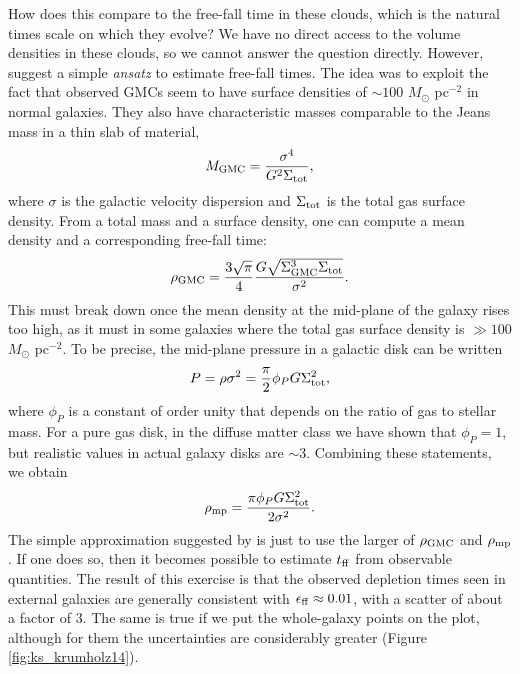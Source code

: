 How does this compare to the free-fall time in these clouds, which is the natural times scale on which they evolve? We have no direct access to the volume densities in these clouds, so we cannot answer the question directly. However, \citet{krumholz12a} suggest a simple \textit{ansatz} to estimate free-fall times. The idea was to exploit the fact that observed GMCs seem to have surface densities of $\sim 100$ $M_\odot$ pc$^{-2}$ in normal galaxies. They also have characteristic masses comparable to the Jeans mass in a thin slab of material,
\begin{equation}
M_{\rm GMC} = \frac{\sigma^4}{G^2 \Sigma_{\rm tot}},
\end{equation}
where $\sigma$ is the galactic velocity dispersion and $\Sigma_{\rm tot}$ is the total gas surface density. From a total mass and a surface density, one can compute a mean density and a corresponding free-fall time:
\begin{equation}
\rho_{\rm GMC} = \frac{3\sqrt{\pi}}{4} \frac{G \sqrt{\Sigma_{\rm GMC}^3 \Sigma_{\rm tot}}}{\sigma^2}.
\end{equation}
This must break down once the mean density at the mid-plane of the galaxy rises too high, as it must in some galaxies where the total gas surface density is $\gg 100$ $M_\odot$ pc$^{-2}$. To be precise, the mid-plane pressure in a galactic disk can be written
\begin{equation}
P = \rho \sigma^2 = \frac{\pi}{2} \phi_P G \Sigma_{\rm tot}^2,
\end{equation}
where $\phi_P$ is a constant of order unity that depends on the ratio of gas to stellar mass. For a pure gas disk, in the diffuse matter class we have shown that $\phi_P = 1$, but realistic values in actual galaxy disks are $\sim 3$. Combining these statements, we obtain
\begin{equation}
\rho_{\rm mp} = \frac{\pi \phi_P G \Sigma_{\rm tot}^2}{2\sigma^2}.
\end{equation}
The simple approximation suggested by \citeauthor{krumholz12a} is just to use the larger of $\rho_{\rm GMC}$ and $\rho_{\rm mp}$. If one does so, then it becomes possible to estimate $t_{\rm ff}$ from observable quantities. The result of this exercise is that the observed depletion times seen in external galaxies are generally consistent with $\epsilon_{\rm ff} \approx 0.01$, with a scatter of about a factor of 3. The same is true if we put the whole-galaxy points on the plot, although for them the uncertainties are considerably greater (Figure \ref{fig:ks_krumholz14}).

